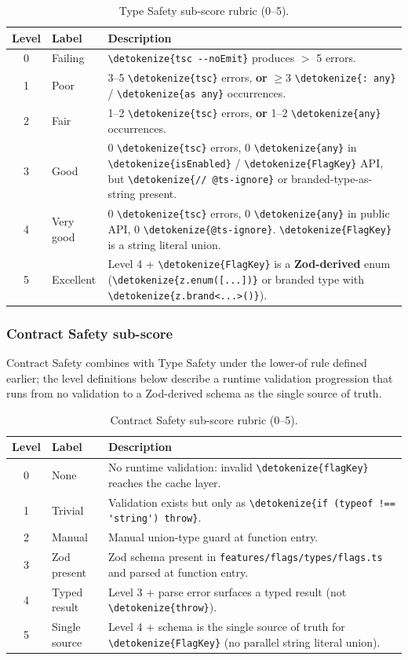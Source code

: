 \documentclass[12pt,a4paper]{report}
\newcommand{\code}[1]{\texttt{\nolinkurl{\detokenize{#1}}}}
\DeclareRobustCommand{\filename}[1]{\bgroup\urlstyle{tt}\nolinkurl{#1}\egroup}
\begin{document}
\begin{table}[H]
\centering
\begin{tabular}{clp{9cm}}
\toprule
\textbf{Level} & \textbf{Label} & \textbf{Description} \\
\midrule
0 & Failing & \code{tsc --noEmit} produces $>$ 5 errors. \\
1 & Poor & 3--5 \code{tsc} errors, \textbf{or} $\geq 3$ \code{: any} / \code{as any} occurrences. \\
2 & Fair & 1--2 \code{tsc} errors, \textbf{or} 1--2 \code{any} occurrences. \\
3 & Good & 0 \code{tsc} errors, 0 \code{any} in \code{isEnabled} / \code{FlagKey} API, but \code{// @ts-ignore} or branded-type-as-string present. \\
4 & Very good & 0 \code{tsc} errors, 0 \code{any} in public API, 0 \code{@ts-ignore}. \code{FlagKey} is a string literal union. \\
5 & Excellent & Level 4 + \code{FlagKey} is a \textbf{Zod-derived} enum (\code{z.enum([...])} or branded type with \code{z.brand<...>()}). \\
\bottomrule
\end{tabular}
\caption{Type Safety sub-score rubric (0--5).}
\label{tab:rubric-type}
\end{table}

\subsubsection{Contract Safety sub-score}

Contract Safety combines with Type Safety under the lower-of rule defined earlier; the level definitions below describe a runtime validation progression that runs from no validation to a Zod-derived schema as the single source of truth.

\begin{table}[H]
\centering
\begin{tabular}{clp{9cm}}
\toprule
\textbf{Level} & \textbf{Label} & \textbf{Description} \\
\midrule
0 & None & No runtime validation: invalid \code{flagKey} reaches the cache layer. \\
1 & Trivial & Validation exists but only as \code{if (typeof !== 'string') throw}. \\
2 & Manual & Manual union-type guard at function entry. \\
3 & Zod present & Zod schema present in \filename{features/flags/types/flags.ts} and parsed at function entry. \\
4 & Typed result & Level 3 + parse error surfaces a typed result (not \code{throw}). \\
5 & Single source & Level 4 + schema is the single source of truth for \code{FlagKey} (no parallel string literal union). \\
\bottomrule
\end{tabular}
\caption{Contract Safety sub-score rubric (0--5).}
\label{tab:rubric-contract}
\end{table}
\end{document}
